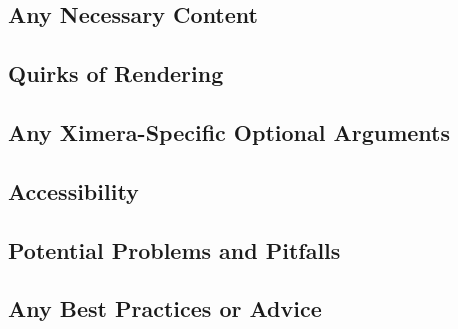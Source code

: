 \documentclass{ximera}
\begin{document}
    \subsection*{Any Necessary Content}
    
    
    
    \subsection*{Quirks of Rendering}
    
    
    
    \subsection*{Any Ximera-Specific Optional Arguments}
    
    
    
    \subsection*{Accessibility}
    
    
    
    \subsection*{Potential Problems and Pitfalls}
    
    
    
    \subsection*{Any Best Practices or Advice}
    
    

    
\end{document}

